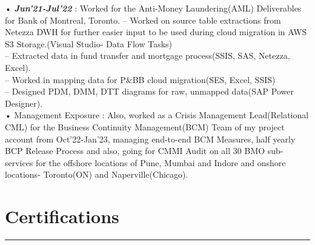 \documentclass[]{class}
\begin{document}
\begin{minipage}[t]{0.66\textwidth}
\begin{minipage}{0.85\textwidth\vspace{2pt}}
• \textbf{\textit{Jun'21-Jul'22}} : Worked for the Anti-Money Laundering(AML) Deliverables for Bank of Montreal, Toronto.
-- Worked on source table extractions from Netezza DWH for further easier input to be used during cloud migration in AWS S3 Storage.(Visual Studio- Data Flow Tasks)\\
-- Extracted data in fund transfer and mortgage process(SSIS, SAS, Netezza, Excel).\\
-- Worked in mapping data for P&BB cloud migration(SES, Excel, SSIS)\\
-- Designed PDM, DMM, DTT diagrams for raw, unmapped data(SAP Power Designer).\\
  
• Management Exposure : Also, worked as a Crisis Management Lead(Relational CML) for the Business Continuity Management(BCM) Team of my project account from Oct'22-Jan'23, managing end-to-end BCM Measures, half yearly BCP Release Process and also, going for CMMI Audit on all 30 BMO sub-services for the offshore locations of Pune, Mumbai and Indore and onshore locations- Toronto(ON) and Naperville(Chicago).\\

\end{minipage}
\sectionsep
\section{Certifications} 
\noindent\rule{12.5cm}{0.4pt}
 
\noindent
\hspace{5em}%
 
\noindent
\hspace{5em}%
\hspace{5em}%
 
\noindent
\hspace{5em}%


\end{minipage} 
\end{document}
